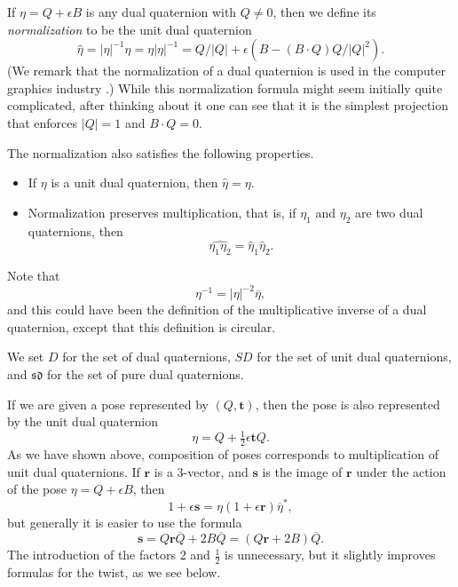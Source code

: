 \documentclass[reqno,12pt]{amsart}
\newcommand\setdualquat{D}
\newcommand\setunitdualquat{SD}
\newcommand\setpuredualquat{\mathfrak{sd}}
\begin{document}
If $\eta = Q + \epsilon B$ is any dual quaternion with $Q \ne 0$, then we define its \emph{normalization} to be the unit dual quaternion
\begin{equation}
\label{normalize}
\widehat \eta = |\eta|^{-1}\eta = \eta|\eta|^{-1}
= Q/|Q| + \epsilon (B - (B\cdot Q) Q/|Q|^2) .
\end{equation}
(We remark that the normalization of a dual quaternion is used in the computer graphics industry \cite{kavan-et-al, kavan-et-al-2}.)  While this normalization formula might seem initially quite complicated, after thinking about it one can see that it is the simplest projection that enforces $|Q| = 1$ and $B\cdot Q = 0$.

The normalization also satisfies the following properties.
\begin{itemize}
\item If $\eta$ is a unit dual quaternion, then $\widehat\eta = \eta$.
\item Normalization preserves multiplication, that is, if $\eta_1$ and $\eta_2$ are two dual quaternions, then
\begin{equation}
\label{normalize mult}
\widehat{\eta_1 \eta_2} = \widehat \eta_1 \widehat \eta_2 .
\end{equation}
\end{itemize}
Note that
\begin{equation}
\eta^{-1} = |\eta|^{-2} \overline\eta,
\end{equation}
and this could have been the definition of the multiplicative inverse of a dual quaternion, except that this definition is circular.

We set $\setdualquat$ for the set of dual quaternions, $\setunitdualquat$ for the set of unit dual quaternions, and $\setpuredualquat$ for the set of pure dual quaternions.

If we are given a pose represented by $(Q, \bm t)$, then the pose is also represented by the unit dual quaternion
\begin{equation}
\label{pose as dual quaternion}
\eta = Q + \tfrac12 \epsilon \bm t Q.
\end{equation}
As we have shown above, composition of poses corresponds to multiplication of unit dual quaternions.  If $\bm r$ is a 3-vector, and $\bm s$ is the image of $\bm r$ under the action of the pose $\eta = Q + \epsilon B$, then
\begin{equation}
\label{defn of pose on 3-vector}
1 + \epsilon \bm s = \eta (1 + \epsilon \bm r) \overline\eta^* ,
\end{equation}
but generally it is easier to use the formula
\begin{equation}
\label{pose on 3-vector}
\bm s = Q \bm r \overline Q + 2 B \overline Q = (Q \bm r + 2 B) \overline Q .
\end{equation}
The introduction of the factors $2$ and $\frac12$ is unnecessary, but it slightly improves formulas for the twist, as we see below.
\end{document}
